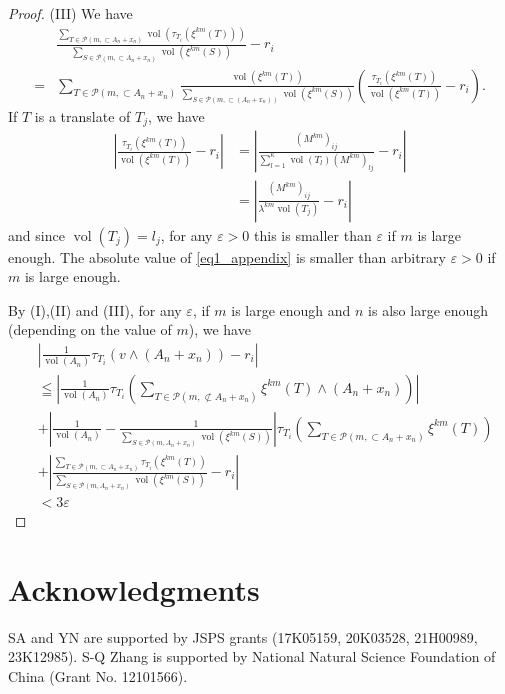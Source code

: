\documentclass[a4]{amsart}
\DeclareMathOperator{\vol}{vol}
\newcommand{\sci}{\wedge}
\theoremstyle{definition}
\begin{document}
\begin{proof}
(III) 
We have
\begin{align}
 &\frac{\sum_{T\in\mathcal{P}(m,\subset A_n+x_n)}\vol(\tau_{T_i}(\xi^{km}(T)))}{\sum_{S\in\mathcal{P}(m,\subset A_n+x_n)}\vol(\xi^{km}(S))}-r_i\nonumber\\
=&\sum_{T\in\mathcal{P}(m,\subset A_n+x_n)}\frac{\vol(\xi^{km}(T))}{\sum_{S\in\mathcal{P}(m,\subset(A_n+x_n))}\vol(\xi^{km}(S))}\left(\frac{\tau_{T_i}(\xi^{km}(T))}{\vol(\xi^{km}(T))}-r_i\right).
\label{eq1_appendix}
\end{align}
If $T$ is a translate of $T_j$, we have
\begin{align*}
   \left|\frac{\tau_{T_i}(\xi^{km}(T))}{\vol(\xi^{km}(T))}-r_i\right|
&=\left|\frac{(M^{km})_{ij}}{\sum_{l=1}^{\kappa}\vol(T_l)(M^{km})_{lj}}-r_i\right|\\
&=\left|\frac{(M^{km})_{ij}}{\lambda^{km}\vol(T_j)}-r_i\right|
\end{align*}
and since $\vol(T_j)=l_j$, for any $\varepsilon>0$
this is smaller than $\varepsilon$ if $m$
is large enough.
The absolute value of \eqref{eq1_appendix} is smaller than arbitrary $\varepsilon>0$ if
$m$ is large enough.

By (I),(II) and (III), for any $\varepsilon$, if $m$ is large enough and $n$ is also large enough
(depending on the value of $m$), we have
\begin{align*}
& \left|\frac{1}{\vol(A_n)}\tau_{T_i}(v\sci (A_n+x_n))-r_i\right|\\
&\leqq\left |\frac{1}{\vol(A_n)}\tau_{T_i}\left(\sum_{T\in\mathcal{P}(m,\not\subset A_n+x_n)}\xi^{km}(T)\sci(A_n+x_n)\right)\right|\\
&+\left|\frac{1}{\vol(A_n)}-\frac{1}{\sum_{S\in\mathcal{P}(m,A_n+x_n)}\vol(\xi^{km}(S))}\right|
\tau_{T_i}\left(\sum_{T\in\mathcal{P}(m,\subset A_n+x_n)}\xi^{km}(T)\right)\\
&+\left|\frac{\sum_{T\in\mathcal{P}(m,\subset A_n+x_n)}\tau_{T_i}(\xi^{km}(T))}{\sum_{S\in\mathcal{P}(m,A_n+x_n)}\vol(\xi^{km}(S))}-r_i\right|\\
&<3\varepsilon
\end{align*}
\end{proof}

\section*{Acknowledgments}
SA and YN are supported by JSPS grants (17K05159, 20K03528, 21H00989, 23K12985). S-Q Zhang is supported by National Natural Science
Foundation of China (Grant No. 12101566). 
\end{document}
